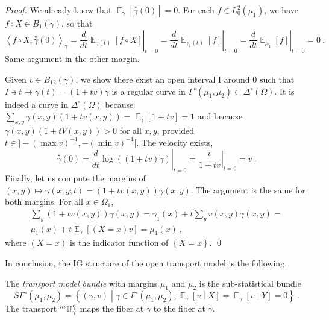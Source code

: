 \documentclass[runningheads]{llncs}
\DeclareMathOperator{\Expectation}{\mathbb E}
\newcommand{\condexpectat}[3]{{\Expectation}_{#1}\left[#2 \middle| #3\right]}
\newcommand{\derivby}[1]{\frac{d}{d#1}}
\newcommand{\expectat}[2]{{\Expectation}_{#1}\left[#2\right]}
\newcommand{\logof}[1]{\log\left( #1 \right)}
\newcommand{\mtransport}[2]{\prescript{m}{}{\mathbb U}_{#1}^{#2}}
\newcommand{\scalarat}[3]{\left\langle #2 , #3 \right\rangle_{#1}}
\newcommand{\setof}[2]{\left\{ #1 \middle| #2 \right\}}
\newcommand{\set}[1]{\left\{ #1 \right\}}
\newcommand{\velocity}[1]{\overset{\star}{#1}}
\begin{document}
\begin{proof}
We already know that $\expectat {\gamma} {\velocity\gamma(0)} = 0$. For each $f \in L^2_0(\mu_1)$, we have $f \circ X \in B_1(\gamma)$, so that 
    \begin{equation*}
    \scalarat \gamma {f \circ X}{\velocity\gamma(0)} = \left. \derivby t \expectat {\gamma(t)} {f \circ X} \right|_{t=0} = \left. \derivby t \expectat {\gamma_1(t)} {f} \right|_{t=0} = \left. \derivby t \expectat {\mu_1} {f} \right|_{t=0} = 0 \ .
    \end{equation*}
Same argument in the other margin.
    
Given $v \in B_{12}(\gamma)$, we show there exist an open interval I around 0 such that $I \ni t \mapsto \gamma(t) = (1+tv)\gamma$ is a regular curve in $\Gamma^\circ(\mu_1,\mu_2) \subset \Delta^\circ(\Omega)$. It is indeed a curve in $\Delta^\circ(\Omega)$ because $\sum_{x,y} \gamma(x,y)(1+tv(x,y)) = \expectat \gamma {1+tv} = 1$ and because $\gamma(x,y)(1+tV(x,y)) > 0$ for all $x,y$, provided $t \in ]- (\max v)^{-1}, - (\min v)^{-1}[$.  The velocity exists,
\    \begin{equation*}
     \velocity\gamma(0) = \left.  \derivby t \logof{(1+tv)\gamma} \right|_{t=0} = \left. \frac v {1+tv} \right|_{t=0} = v \ .
    \end{equation*}
Finally, let us compute the margins of $(x,y) \mapsto \gamma(x,y;t) = (1+tv(x,y))\gamma(x,y)$. The argument is the same for both margins. For all $x \in \Omega_1$,
\begin{multline*}
  \sum_y (1+tv(x,y))\gamma(x,y) = \gamma_1(x) + t \sum_y v(x,y)\gamma(x,y) = \\ \mu_1(x) + t \expectat \gamma {(X = x) v} = \mu_1(x) \ ,
\end{multline*}
where $(X = x)$ is the indicator function of $\set{X = x}$. \qed
\end{proof}
 
In conclusion, the IG structure of the open transport model is the following.

\begin{proposition} The \emph{transport model bundle} with margins $\mu_1$ and $\mu_2$ is the sub-statistical bundle
\begin{equation} \label{eq:2}
  S\Gamma^\circ(\mu_1,\mu_2) = \setof{(\gamma,v)}{\gamma\in\Gamma^\circ(\mu_1,\mu_2), \condexpectat \gamma v X = \condexpectat \gamma v Y = 0} \ .
\end{equation}
The transport $\mtransport {\gamma} {\bar\gamma}$ maps the fiber at $\gamma$ to the fiber at $\bar\gamma$.
\end{proposition}
\end{document}
